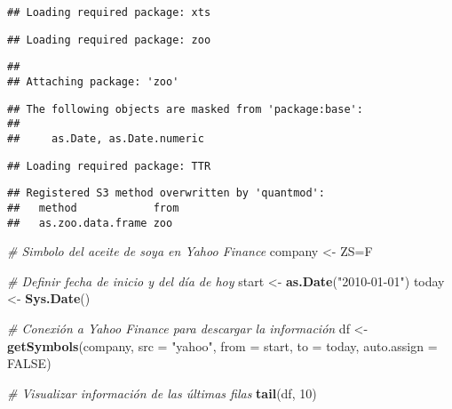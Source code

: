 \documentclass[
]{book}
\newenvironment{Shaded}{\begin{snugshade}}{\end{snugshade}}
\newcommand{\AttributeTok}[1]{\textcolor[rgb]{0.13,0.29,0.53}{#1}}
\newcommand{\CommentTok}[1]{\textcolor[rgb]{0.56,0.35,0.01}{\textit{#1}}}
\newcommand{\ConstantTok}[1]{\textcolor[rgb]{0.56,0.35,0.01}{#1}}
\newcommand{\DecValTok}[1]{\textcolor[rgb]{0.00,0.00,0.81}{#1}}
\newcommand{\FunctionTok}[1]{\textcolor[rgb]{0.13,0.29,0.53}{\textbf{#1}}}
\newcommand{\NormalTok}[1]{#1}
\newcommand{\OtherTok}[1]{\textcolor[rgb]{0.56,0.35,0.01}{#1}}
\newcommand{\StringTok}[1]{\textcolor[rgb]{0.31,0.60,0.02}{#1}}
\begin{document}
\begin{verbatim}
## Loading required package: xts
\end{verbatim}

\begin{verbatim}
## Loading required package: zoo
\end{verbatim}

\begin{verbatim}
## 
## Attaching package: 'zoo'
\end{verbatim}

\begin{verbatim}
## The following objects are masked from 'package:base':
## 
##     as.Date, as.Date.numeric
\end{verbatim}

\begin{verbatim}
## Loading required package: TTR
\end{verbatim}

\begin{verbatim}
## Registered S3 method overwritten by 'quantmod':
##   method            from
##   as.zoo.data.frame zoo
\end{verbatim}

\begin{Shaded}
\begin{Highlighting}[]
\CommentTok{\# Simbolo del aceite de soya en Yahoo Finance}
\NormalTok{company }\OtherTok{\textless{}{-}} \StringTok{\textquotesingle{}ZS=F\textquotesingle{}}

\CommentTok{\# Definir fecha de inicio y del día de hoy}
\NormalTok{start }\OtherTok{\textless{}{-}} \FunctionTok{as.Date}\NormalTok{(}\StringTok{"2010{-}01{-}01"}\NormalTok{)}
\NormalTok{today }\OtherTok{\textless{}{-}} \FunctionTok{Sys.Date}\NormalTok{()}

\CommentTok{\# Conexión a Yahoo Finance para descargar la información}
\NormalTok{df }\OtherTok{\textless{}{-}} \FunctionTok{getSymbols}\NormalTok{(company, }\AttributeTok{src =} \StringTok{"yahoo"}\NormalTok{, }\AttributeTok{from =}\NormalTok{ start, }\AttributeTok{to =}\NormalTok{ today, }\AttributeTok{auto.assign =} \ConstantTok{FALSE}\NormalTok{)}

\CommentTok{\# Visualizar información de las últimas filas}
\FunctionTok{tail}\NormalTok{(df, }\DecValTok{10}\NormalTok{)}
\end{Highlighting}
\end{Shaded}
\end{document}
